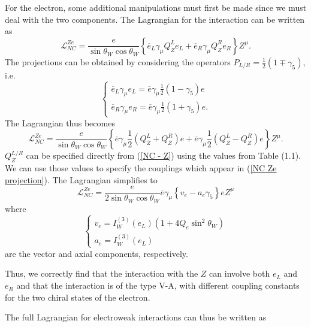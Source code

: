 \documentclass[10pt,a4paper]{book}
\begin{document}
For the electron, some additional manipulations must first be made since we must deal with the two components. The Lagrangian for the interaction can be written as
\begin{equation}
\mathcal{L}_{NC}^{Ze} = \frac{e}{\sin\theta_W\cos\theta_W}\left\lbrace \overline{e}_L \gamma_\mu Q_Z^L e_L + \overline{e}_R \gamma_\mu Q_Z^R e_R  \right\rbrace Z^\mu.
\end{equation}
The projections can be obtained by considering the operators $P_{L/R} = \frac{1}{2}\left(1 \mp \gamma_5\right)$, i.e.
\begin{equation}
\begin{cases}
\overline{e}_L \gamma_\mu e_L = \overline{e} \gamma_\mu \frac{1}{2}\left(1-\gamma_5\right)e \\
\overline{e}_R \gamma_\mu e_R = \overline{e} \gamma_\mu \frac{1}{2}\left(1+\gamma_5\right)e .
\end{cases}
\end{equation}
The Lagrangian thus becomes
\begin{equation}
\label{NC Ze projection}
\mathcal{L}_{NC}^{Ze} = \frac{e}{\sin\theta_W\cos\theta_W}\left\lbrace \overline{e}\gamma_\mu\frac{1}{2}(Q^L_Z + Q^R_Z)e + \overline{e}\gamma_\mu\frac{1}{2}(Q^L_Z - Q^R_Z)e  \right\rbrace Z^\mu.
\end{equation}
$Q_Z^{L/R}$ can be specified directly from (\ref{NC - Z}) using the values from Table (1.1). We can use those values to specify the couplings which appear in (\ref{NC Ze projection}). The Lagrangian simplifies to
\begin{equation}
\mathcal{L}^{Ze}_{NC} = \frac{e}{2\sin\theta_W\cos\theta_W} \overline{e}\gamma_\mu \left\lbrace v_e - a_e \gamma_5\right\rbrace e Z^\mu
\end{equation} 
where
\begin{equation}
\begin{cases}
v_e = I^{(3)}_W (e_L) \left( 1 + 4Q_e\sin^2\theta_W \right) \\
a_e = I^{(3)}_W (e_L)
\end{cases}
\end{equation}
are the vector and axial components, respectively. 

Thus, we correctly find that the interaction with the $Z$ can involve both $e_L$ and $e_R$ and that the interaction is of the type V-A, with different coupling constants for the two chiral states of the electron. 

The full Lagrangian for electroweak interactions can thus be written as
\end{document}
